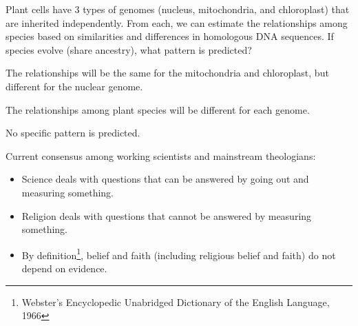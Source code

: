 \begin{frame}
    \begin{clickerquestion}
        \item Plant cells have 3 types of genomes (nucleus, mitochondria, and
            chloroplast) that are inherited independently. From each, we can
            estimate the relationships among
            species based on similarities and differences in homologous DNA
            sequences. If species evolve (share ancestry), what pattern
            is predicted?
        \begin{clickeroptions}
            \item The relationships will be the same for the mitochondria and
                chloroplast, but different for the nuclear genome. 

            \item The relationships among plant species will be different for
                each genome.

            \item {}

            \item No specific pattern is predicted. 
        \end{clickeroptions}
    \end{clickerquestion}
\end{frame}

\begin{frame}
    Current consensus among working scientists and mainstream theologians:

    \begin{itemize}
        \item<2-> Science deals with questions that can be answered by going out
            and measuring something.
        \item<3-> Religion deals with questions that cannot be answered by
            measuring something. 
        \item<4-> By definition\footnote{\scriptsize Webster’s Encyclopedic Unabridged
                Dictionary of the English Language, 1966}, belief and faith
            (including religious belief and faith) do not depend on evidence. 
    \end{itemize}

\end{frame}


